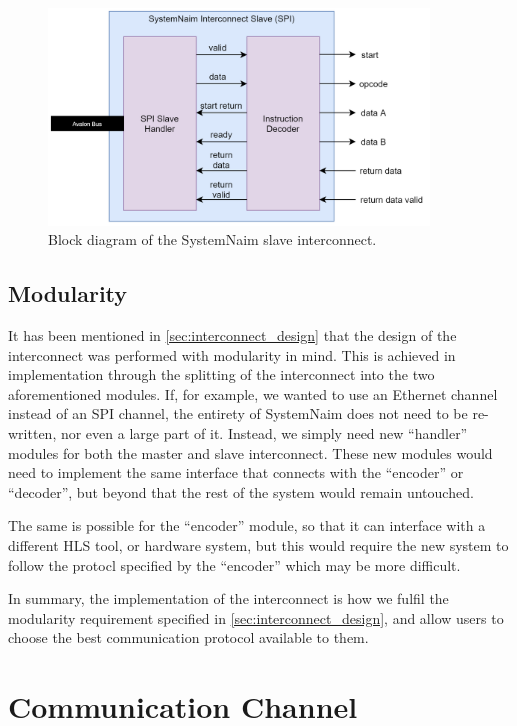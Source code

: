 \begin{figure}[!htb]
    \centering
    \includegraphics[width=0.9\textwidth]{04_Implementation/images/interconnect_slave.png}
    \caption{Block diagram of the SystemNaim slave interconnect.}
    \label{fig:slave_interconnect}
\end{figure}

\subsection{Modularity}

It has been mentioned in \autoref{sec:interconnect_design} that the design of the interconnect was performed with modularity in mind. This is achieved in implementation through the splitting of the interconnect into the two aforementioned modules. If, for example, we wanted to use an Ethernet channel instead of an SPI channel, the entirety of SystemNaim does not need to be re-written, nor even a large part of it. Instead, we simply need new “handler” modules for both the master and slave interconnect. These new modules would need to implement the same interface that connects with the “encoder” or “decoder”, but beyond that the rest of the system would remain untouched. 

The same is possible for the “encoder” module, so that it can interface with a different HLS tool, or hardware system, but this would require the new system to follow the protocl specified by the “encoder” which may be more difficult.

In summary, the implementation of the interconnect is how we fulfil the modularity requirement specified in \autoref{sec:interconnect_design}, and allow users to choose the best communication protocol available to them.

\section{Communication Channel}

